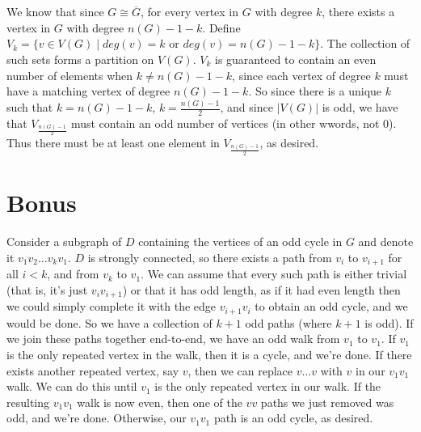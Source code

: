 \documentclass[11pt]{article}
\begin{document}
\section{} %
We know that since $G\cong\overline{G}$, for every vertex in $G$ with degree
$k$, there exists a vertex in $G$ with degree $n(G)-1-k$. Define
$V_k=\{v\in V(G)\mid deg(v)=k\textrm{ or }deg(v)=n(G)-1-k\}$. The collection of
such sets forms a partition on $V(G)$. $V_k$ is guaranteed to contain an even
number of elements when $k\neq n(G)-1-k$, since each vertex of degree $k$ must
have a matching vertex of degree $n(G)-1-k$. So since there is a unique $k$ such
that $k=n(G)-1-k$, $k=\frac{n(G)-1}{2}$, and since $|V(G)|$ is odd, we have that
$V_\frac{n(G)-1}{2}$ must contain an odd number of vertices (in other wwords,
not 0). Thus there must be at least one element in $V_\frac{n(G)-1}{2}$, as desired.


\section{Bonus} %
Consider a subgraph of $D$ containing the vertices of an odd cycle in $G$ and
denote it $v_1v_2\ldots v_kv_1$. $D$ is strongly connected, so there exists a
path from $v_i$ to $v_{i+1}$ for all $i<k$, and from $v_k$ to $v_1$. We can
assume that every such path is either trivial (that is, it's just $v_iv_{i+1}$)
or that it has odd length, as if it had even length then we could simply
complete it with the edge $v_{i+1}v_i$ to obtain an odd cycle, and we would be
done. So we have a collection of $k+1$ odd paths (where $k+1$ is odd). If we
join these paths together end-to-end, we have an odd walk from $v_1$ to $v_1$.
If $v_1$ is the only repeated vertex in the walk, then it is a cycle, and we're
done. If there exists another repeated vertex, say $v$, then we can replace
$v\ldots v$ with $v$ in our $v_1v_1$ walk. We can do this until $v_1$ is the
only repeated vertex in our walk. If the resulting $v_1v_1$ walk is now even,
then one of the $vv$ paths we just removed was odd, and we're done. Otherwise,
our $v_1v_1$ path is an odd cycle, as desired.
\end{document}
